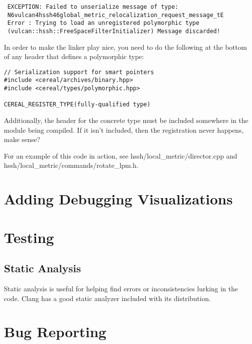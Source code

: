\documentclass{article}
\begin{document}
\begin{verbatim}
 EXCEPTION: Failed to unserialize message of type: 
 N6vulcan4hssh46global_metric_relocalization_request_message_tE
 Error : Trying to load an unregistered polymorphic type 
 (vulcan::hssh::FreeSpaceFilterInitializer) Message discarded!
\end{verbatim}

In order to make the linker play nice, you need to do the following at the bottom of any header that defines a 
polymorphic type:

\begin{verbatim}
// Serialization support for smart pointers
#include <cereal/archives/binary.hpp>
#include <cereal/types/polymorphic.hpp>

CEREAL_REGISTER_TYPE(fully-qualified type)
\end{verbatim}

Additionally, the header for the concrete type must be included somewhere in the module being compiled. If it isn't 
included, then the registration never happens, make sense?

For an example of this code in action, see hssh/local\_metric/director.cpp and \\
hssh/local\_metric/commands/rotate\_lpm.h.

\section{Adding Debugging Visualizations}


\section{Testing}

\subsection{Static Analysis}

Static analysis is useful for helping find errors or inconsistencies lurking in the code. Clang has a good static 
analyzer included with its distribution.

\section{Bug Reporting}
    
    
\end{document}
